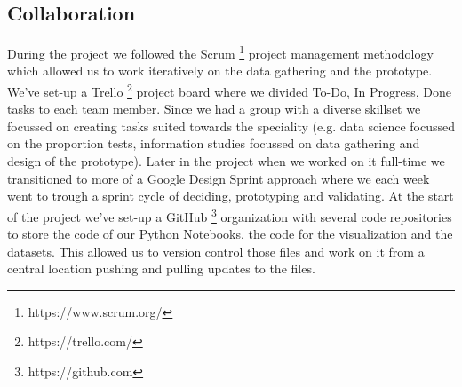 \subsection{Collaboration}

During the project we followed the Scrum \footnote{https://www.scrum.org/} project management methodology which allowed us to work iteratively on the data gathering and the prototype. We've set-up a Trello \footnote{https://trello.com/} project board where we divided To-Do, In Progress, Done tasks to each team member. Since we had a group with a diverse skillset we focussed on creating tasks suited towards the speciality (e.g. data science focussed on the proportion tests, information studies focussed on data gathering and design of the prototype). Later in the project when we worked on it full-time we transitioned to more of a Google Design Sprint approach where we each week went to trough a sprint cycle of deciding, prototyping and validating. At the start of the project we've set-up a GitHub \footnote{https://github.com} organization with several code repositories to store the code of our Python Notebooks, the code for the visualization and the datasets. This allowed us to version control those files and work on it from a central location pushing and pulling updates to the files.